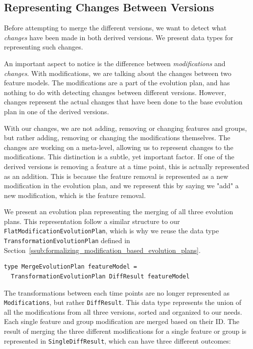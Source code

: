 \documentclass[a4paper,english]{ifimaster}
\begin{document}
\subsection{Representing Changes Between Versions}%
\label{sub:representing_changes_between_versions}

Before attempting to merge the different versions, we want to detect what \textit{changes} have been made in both derived versions. We present data types for representing such changes.

An important aspect to notice is the difference between \textit{modifications} and \textit{changes}. With modifications, we are talking about the changes between two feature models. The modifications are a part of the evolution plan, and has nothing to do with detecting changes between different versions. However, changes represent the actual changes that have been done to the base evolution plan in one of the derived versions.

With our changes, we are not adding, removing or changing features and groups, but rather adding, removing or changing the modifications themselves. The changes are working on a meta-level, allowing us to represent changes to the modifications. This distinction is a subtle, yet important factor. If one of the derived versions is removing a feature at a time point, this is actually represented as an addition. This is because the feature removal is represented as a new modification in the evolution plan, and we represent this by saying we "add" a new modification, which is the feature removal.

We present an evolution plan representing the merging of all three evolution plans. This representation follow a similar structure to our \texttt{Flat\-Modification\-Evolution\-Plan}, which is why we reuse the data type \texttt{Transformation\-Evolution\-Plan} defined in Section~\vref{ssub:formalizing_modification_based_evolution_plans}.

\begin{verbatim}
type MergeEvolutionPlan featureModel = 
  TransformationEvolutionPlan DiffResult featureModel
\end{verbatim}

The transformations between each time points are no longer represented as \texttt{Modifications}, but rather \texttt{DiffResult}. This data type represents the union of all the modifications from all three versions, sorted and organized to our needs. Each single feature and group modification are merged based on their ID. The result of merging the three different modifications for a single feature or group is represented in \texttt{SingleDiffResult}, which can have three different outcomes:
\end{document}
